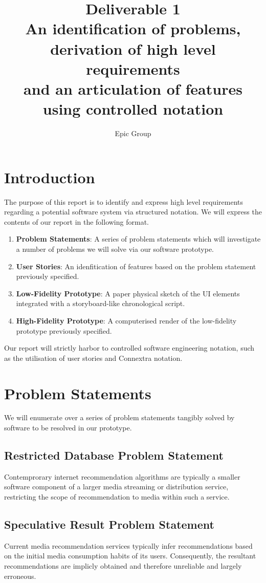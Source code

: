 \documentclass{article}
\begin{document}
\title{%
 Deliverable 1\\
 \large An identification of problems, derivation of high level requirements\\
 \large and an articulation of features using controlled notation
}
\author{Epic Group}
\date{}
\maketitle

\section*{Introduction}
The purpose of this report is to identify and express high level requirements
regarding a potential software system via structured notation. We will express
the contents of our report in the following format.
\begin{enumerate}
\item \textbf{Problem Statements}: A series of problem statements which will
investigate a number of problems we will solve via our software prototype.
\item \textbf{User Stories}: An idenfitication of features based on the problem
statement previously specified.
\item \textbf{Low-Fidelity Prototype}: A paper physical sketch of the UI 
elements integrated with a storyboard-like chronological script.
\item \textbf{High-Fidelity Prototype}: A computerised render of the
low-fidelity prototype previously specified.
\end{enumerate}
Our report will strictly harbor to controlled software engineering notation, 
such as the utilisation of user stories and Connextra notation.
\section{Problem Statements}
We will enumerate over a series of problem statements tangibly solved by
software to be resolved in our prototype.

\subsection{Restricted Database Problem Statement}
Contemprorary internet recommendation algorithms are typically a smaller
software component of a larger media streaming or distribution service,
restricting the scope of recommendation to media within such a service.
\subsection{Speculative Result Problem Statement}
Current media recommendation services typically infer recommendations based
on the initial media consumption habits of its users. Consequently,
the resultant recommendations are implicly obtained and therefore unreliable
and largely erroneous.
\end{document}
